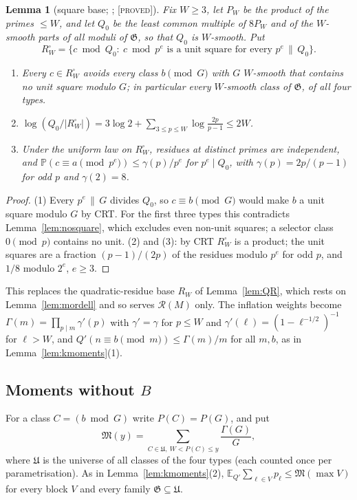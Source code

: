 \documentclass[10pt,reqno]{amsart}
\newtheorem{lemma}[theorem]{Lemma}
\theoremstyle{definition}
\theoremstyle{remark}
\newcommand{\cR}{\mathscr R}
\newcommand{\cG}{\mathfrak G}
\newcommand{\E}{\mathbb E}
\newcommand{\Prob}{\mathbb P}
\newcommand{\lab}[1]{\textup{[\textsc{#1}]}}
\begin{document}
\begin{lemma}[square base; {\cite[Lemma~2.3]{KA2}}; \lab{proved}]\label{lem:squarebase}
Fix $W\geq3$, let $P_W$ be the product of the primes $\leq W$, and let
$Q_0$ be the least common multiple of $8P_W$ and
of the $W$-smooth parts of all moduli of $\cG$, so that $Q_0$ is
$W$-smooth.  Put
\[
 R_W^\square=\{c\bmod Q_0:\ c\bmod p^e\text{ is a unit square for every }p^e\,\|\,Q_0\}.
\]
\begin{enumerate}
\item Every $c\in R_W^\square$ avoids every class $b\pmod G$ with $G$
  $W$-smooth that contains no unit square modulo $G$; in particular
  every $W$-smooth class of $\cG$, of all four types.
\item $\log(Q_0/|R_W^\square|)=3\log2+\sum_{3\leq p\leq W}\log\frac{2p}{p-1}\leq2W$.
\item Under the uniform law on $R_W^\square$, residues at distinct primes
  are independent, and $\Prob(c\equiv a\pmod{p^e})\leq\gamma(p)/p^e$ for
  $p^e\mid Q_0$, with $\gamma(p)=2p/(p-1)$ for odd $p$ and $\gamma(2)=8$.
\end{enumerate}
\end{lemma}
\begin{proof}
(1) Every $p^e\,\|\,G$ divides $Q_0$, so $c\equiv b\pmod G$ would make $b$ a
unit square modulo $G$ by CRT.  For the first three types this
contradicts Lemma~\ref{lem:nosquare}, which excludes even non-unit
squares; a selector class $0\pmod p$ contains no unit.  (2) and (3): by
CRT $R_W^\square$ is a product; the unit squares are a fraction
$(p-1)/(2p)$ of the residues modulo $p^e$ for odd $p$, and $1/8$ modulo
$2^e$, $e\geq3$.
\end{proof}
This replaces the quadratic-residue base $R_W$ of Lemma~\ref{lem:QR},
which rests on Lemma~\ref{lem:mordell} and so serves $\cR(M)$ only.  The
inflation weights become $\Gamma(m)=\prod_{p\mid m}\gamma'(p)$ with
$\gamma'=\gamma$ for $p\leq W$ and $\gamma'(\ell)=(1-\ell^{-1/2})^{-1}$ for
$\ell>W$, and $Q'(n\equiv b\pmod m)\leq\Gamma(m)/m$ for all $m,b$, as in
Lemma~\ref{lem:kmoments}(1).

\subsection{Moments without \texorpdfstring{$B$}{B}}
For a class $C=(b\bmod G)$ write $P(C)=P(G)$, and put
\[
 \mathfrak M(y)=\sum_{C\in\mathfrak U,\ W<P(C)\leq y}\frac{\Gamma(G)}G,
\]
where $\mathfrak U$ is the universe of all classes of the four types (each
counted once per parametrisation).  As in Lemma~\ref{lem:kmoments}(2),
$\E_{Q'}\sum_{\ell\in V}p_\ell\leq\mathfrak M(\max V)$ for every block $V$ and
every family $\cG\subseteq\mathfrak U$.
\end{document}
